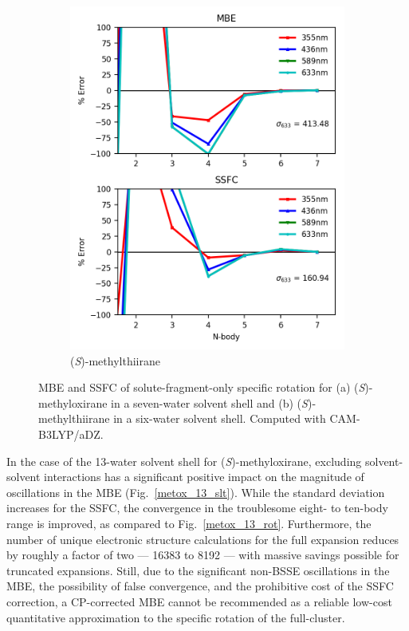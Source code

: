 \begin{figure}
\begin{subfigure}{0.5\textwidth}
                \includegraphics[scale=0.75]{p1/graphs/metthi_6_slt_rot.png}
                \caption{(\textit{S})-methylthiirane}
                \label{metthi_slt}
            \end{subfigure}
            \caption{MBE and SSFC of solute-fragment-only specific rotation for (a) (\textit{S})-methyloxirane in a seven-water solvent shell and (b) (\textit{S})-methylthiirane in a six-water solvent shell. Computed with CAM-B3LYP/aDZ.}
            \label{slt}
        \end{figure}

        In the case of the 13-water solvent shell for (\textit{S})-methyloxirane, excluding solvent-solvent interactions has a significant positive impact on the magnitude of oscillations in the MBE (Fig.~\ref{metox_13_slt}). While the standard deviation increases for the SSFC, the convergence in the troublesome eight- to ten-body range is improved, as compared to Fig.~\ref{metox_13_rot}.  Furthermore, the number of unique electronic structure calculations for the full expansion reduces by roughly a factor of two --- 16383 to 8192 --- with massive savings possible for truncated expansions. Still, due to the significant non-BSSE oscillations in the MBE, the possibility of false convergence, and the prohibitive cost of the SSFC correction, a CP-corrected MBE cannot be recommended as a reliable low-cost quantitative approximation to the specific rotation of the full-cluster. 

